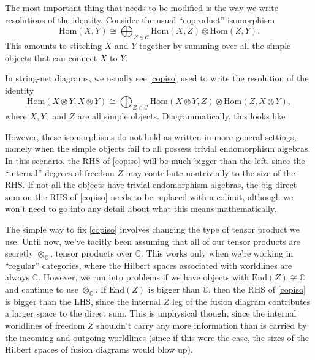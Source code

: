 \documentclass[12pt,a4paper]{article}
\newcommand{\tp}{\otimes}
\newcommand{\cc}{\mathbb{C}}
\newcommand\be            {\begin{equation}}
\newcommand\ee            {\end{equation}}
\newcommand{\mcc}{\mathcal{C}}
\newcommand{\Hom}{\text{Hom}}
\newcommand{\End}{\text{End}}
\newcommand{\dave}[1]{{\color{ao(english)}\footnotesize{(DA) #1}}}
\newcommand{\ethan}[1]{{\color{amethyst}\footnotesize{(EL) #1}}}
\begin{document}
The most important thing that needs to be modified is the way we write resolutions of the identity. Consider the usual ``coproduct'' isomorphism
\be\label{copiso} \Hom(X,Y) \cong \bigoplus_{Z\in \mcc} \Hom(X,Z) \tp \Hom(Z,Y).\ee
This amounts to stitching $X$ and $Y$ together by summing over all the simple objects that can connect $X$ to $Y$. 

In string-net diagrams, we usually see \eqref{copiso} used to write the resolution of the identity 
\be \Hom(X\tp Y,X\tp Y) \cong \bigoplus_{Z\in \mcc} \Hom(X\tp Y,Z) \tp \Hom(Z,X\tp Y),\ee
where $X,Y,$ and $Z$ are all simple objects. Diagrammatically, this looks like 


However, these isomorphisms do not hold as written in more general settings, namely when the simple objects fail to all possess trivial endomorphism algebras. In this scenario, the RHS of \eqref{copiso} will be much bigger than the left, since the ``internal'' degrees of freedom $Z$ may contribute nontrivially to the size of the RHS.
If not all the objects have trivial endomorphism algebras, the big direct sum on the RHS of \eqref{copiso} needs to be replaced with a colimit, although we won't need to go into any detail about what this means mathematically. %

The simple way to fix \eqref{copiso} involves changing the type of tensor product we use. Until now, we've tacitly been assuming that all of our tensor products are secretly $\tp_\cc$, tensor products over $\cc$. This works only when we're working in ``regular'' categories, where the Hilbert spaces associated with worldlines are always $\cc$. However, we run into problems if we have objects with $\End(Z) \not\cong \cc$ and continue to use $\tp_\cc$. If $\End(Z)$ is bigger than $\cc$, then the RHS of \eqref{copiso} is bigger than the LHS, since the internal $Z$ leg of the fusion diagram contributes a larger space to the direct sum. This is unphysical though, since the internal worldlines of freedom $Z$ shouldn't carry any more information than is carried by the incoming and outgoing worldlines (since if this were the case, the sizes of the Hilbert spaces of fusion diagrams would blow up). 
\end{document}
